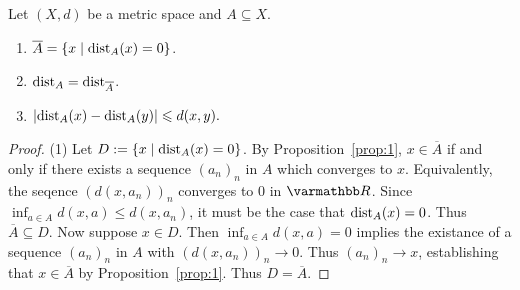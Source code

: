     \begin{proposition}
        Let $(X,d)$ be a metric space and $A \subseteq X$.
        \begin{enumerate}[label = (\arabic*),itemsep=1pt,topsep=3pt]
            \item $\overline{A} = \{x \mid \operatorname{dist}_A(x) = 0 \}$.
            \item $\operatorname{dist}_A = \operatorname{dist}_{\overline{A}}$.
            \item $\left| \operatorname{dist}_A(x) - \operatorname{dist}_A(y) \right| \leqslant d(x,y).$
        \end{enumerate}
    \end{proposition}
        \begin{proof}
            (1) Let $D:=\{x \mid \operatorname{dist}_A(x) = 0\}$. By Proposition~\ref{prop:1}, $x \in \overline{A}$ if and only if there exists a sequence $(a_n)_n$ in $A$ which converges to $x$. Equivalently, the seqence $(d(x,a_n))_n$ converges to $0$ in $\bfR$. Since $\inf_{a \in A}d(x,a) \leq d(x,a_n)$, it must be the case that $\operatorname{dist}_A(x) = 0$. Thus $\overline{A} \subseteq D$. Now suppose $x \in D$. Then $\inf_{a \in A}d(x,a) = 0$ implies the existance of a sequence $(a_n)_n$ in $A$ with $(d(x,a_n))_n \rightarrow 0$. Thus $(a_n)_n \rightarrow x$, establishing that $x \in \overline{A}$ by Proposition~\ref{prop:1}. Thus $D = \overline{A}$.


\end{proof}

